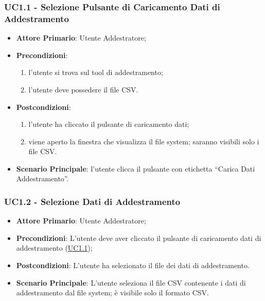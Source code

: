 		\subsubsection{UC1.1 - Selezione Pulsante di Caricamento Dati di Addestramento}
		\begin{itemize}
			\item\textbf{Attore Primario}: Utente Addestratore;
			\item\textbf{Precondizioni}: 
				\begin{enumerate}
					\item l’utente si trova sul tool di addestramento;
					\item l’utente deve possedere il file CSV.
				\end{enumerate}
			\item\textbf{Postcondizioni}:
				\begin{enumerate}
					\item l’utente ha cliccato il pulsante di caricamento dati;
					\item viene aperto la finestra che visualizza il file system; saranno visibili solo i file CSV.
				\end{enumerate}
			\item\textbf{Scenario Principale}: l’utente clicca il pulsante con etichetta “Carica Dati Addestramento”.
		\end{itemize}
		
		\label{par:UC1.2}
		\subsubsection{UC1.2 - Selezione Dati di Addestramento }
		\begin{itemize}
			\item\textbf{Attore Primario}: Utente Addestratore;
			\item\textbf{Precondizioni}: L’utente deve aver cliccato il pulsante di caricamento dati di addestramento (\hyperref[par:UC1.1]{UC1.1});
			\item\textbf{Postcondizioni}: L’utente ha selezionato il file dei dati di addestramento.
			\item\textbf{Scenario Principale}: L’utente seleziona il file CSV contenente i dati di addestramento dal file system; è visibile solo il formato CSV.
		\end{itemize}
		
		\label{par:UC1.3}
